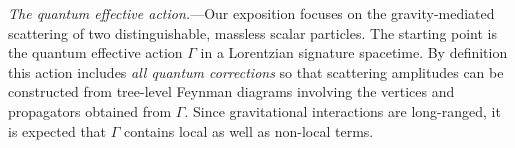 \documentclass[aps,prl,reprint,twocolumn,superscriptaddress,longbibliography,nofootinbib,floatfix,showpacs]{revtex4-1}
\begin{document}
\textit{The quantum effective action.}---Our exposition focuses on the gravity-mediated scattering of two distinguishable, massless scalar particles.
The starting point is the quantum effective action $\Gamma$ in a Lorentzian signature spacetime.
By definition this action includes \emph{all quantum corrections} so that scattering amplitudes can be constructed from tree-level Feynman diagrams involving the vertices and propagators obtained from $\Gamma$.
Since gravitational interactions are long-ranged, it is expected that $\Gamma$ contains local as well as non-local terms.
\end{document}
